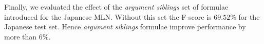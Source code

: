Finally, we evaluated the effect of the \emph{argument siblings} set of formulae 
introduced for the Japanese MLN. Without this set the F-score is $69.52\%$ 
for the Japanese test set. Hence \emph{argument siblings} formulae  improve performance by more than $6\%$.







